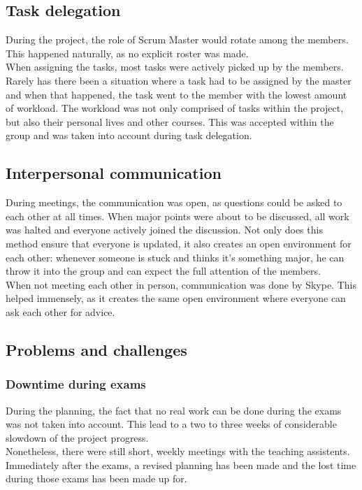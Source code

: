 \documentclass[10pt,a4paper]{report}
\begin{document}
		\subsection{Task delegation}
			During the project, the role of Scrum Master would rotate among the members. This happened naturally, as no explicit roster was made. \\
			When assigning the tasks, most tasks were actively picked up by the members. Rarely has there been a situation where a task had to be assigned by the master and when that happened, the task went to the member with the lowest amount of workload. The workload was not only comprised of tasks within the project, but also their personal lives and other courses. This was accepted within the group and was taken into account during task delegation.

		\subsection{Interpersonal communication}
			During meetings, the communication was open, as questions could be asked to each other at all times. When major points were about to be discussed, all work was halted and everyone actively joined the discussion. Not only does this method ensure that everyone is updated, it also creates an open environment for each other: whenever someone is stuck and thinks it's something major, he can throw it into the group and can expect the full attention of the members.\\
			When not meeting each other in person, communication was done by Skype. This helped immensely, as it creates the same open environment where everyone can ask each other for advice.

		\subsection{Problems and challenges}
			\subsubsection*{Downtime during exams}
				During the planning, the fact that no real work can be done during the exams was not taken into account. This lead to a two to three weeks of considerable slowdown of the project progress.\\
				Nonetheless, there were still short, weekly meetings with the teaching assistents. Immediately after the exams, a revised planning has been made and the lost time during those exams has been made up for.
\end{document}
